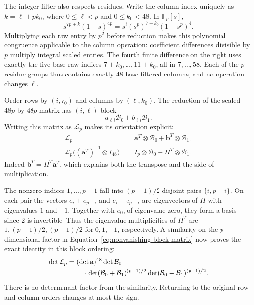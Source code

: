 The integer filter also respects residues. Write the column index
uniquely as $k=\ell+pk_0$, where
$0\le\ell<p$ and $0\le k_0<48$. In $\mathbb F_p[s]$,
\begin{equation}\label{eq:nonvanishing-residue-filter}
 s^{7p+k}(1-s)^{4p}
   =s^\ell(s^p)^{7+k_0}(1-s^p)^4.
\end{equation}
Multiplying each raw entry by $p^2$ before reduction makes this polynomial
congruence applicable to the column operation: coefficient differences
divisible by $p$ multiply integral scaled entries. The fourth finite
difference on the right uses exactly the five base raw indices
$7+k_0,\ldots,11+k_0$,
all in $7,\ldots,58$. Each of the $p$ residue groups thus contains
exactly $48$ base filtered columns, and no operation changes $\ell$.

Order rows by $(i,r_0)$ and columns by $(\ell,k_0)$. The reduction of
the scaled $48p$ by $48p$ matrix has $(i,\ell)$ block
\[
 a_{\ell i}\mathcal B_0+b_{\ell i}\mathcal B_1.
\]
Writing this matrix as $\mathcal L_p$ makes its orientation explicit:
\begin{equation}\label{eq:nonvanishing-block-matrix}
 \begin{split}
 \mathcal L_p&=\mathbf a^T\otimes\mathcal B_0
                       +\mathbf b^T\otimes\mathcal B_1,\\
 \mathcal L_p\bigl((\mathbf a^T)^{-1}\otimes I_{48}\bigr)
      &=I_p\otimes\mathcal B_0+\Pi^T\otimes\mathcal B_1.
 \end{split}
\end{equation}
Indeed $\mathbf b^T=\Pi^T\mathbf a^T$, which explains both the
transpose and the side of multiplication.

The nonzero indices $1,\ldots,p-1$ fall into $(p-1)/2$ disjoint pairs
$\{i,p-i\}$. On each pair the vectors $e_i+e_{p-i}$ and
$e_i-e_{p-i}$ are eigenvectors of $\Pi$ with eigenvalues $1$ and
$-1$. Together with $e_0$, of eigenvalue zero, they form a basis since
$2$ is invertible. Thus the eigenvalue multiplicities of $\Pi^T$ are
$1,(p-1)/2,(p-1)/2$ for $0,1,-1$, respectively. A similarity on the
$p$-dimensional factor in Equation~\eqref{eq:nonvanishing-block-matrix}
now proves the exact identity in this block ordering:
\begin{align}
 \det\mathcal L_p
  ={}&(\det\mathbf a)^{48}\det\mathcal B_0\notag\\
    &\quad\cdot\det(\mathcal B_0+\mathcal B_1)^{(p-1)/2}
          \det(\mathcal B_0-\mathcal B_1)^{(p-1)/2}.
 \label{eq:nonvanishing-factorization}
\end{align}
There is no determinant factor from the similarity. Returning to the
original row and column orders changes at most the sign.

